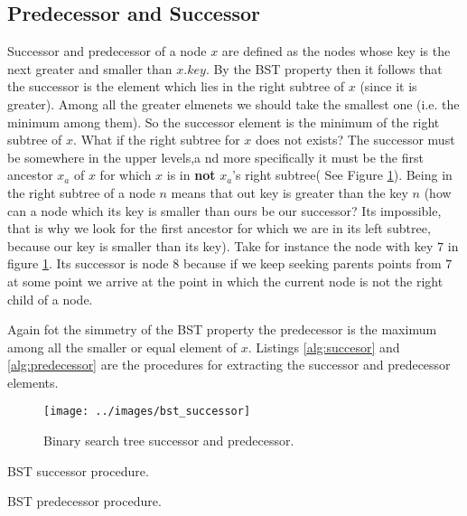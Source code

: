 \subsection{Predecessor and Successor}
Successor and predecessor of a node $x$ are defined as the nodes whose key is the next greater and smaller than $x.key$.
By the BST property then it follows that the successor is the element which lies in the right subtree of $x$ (since it is greater). Among all the greater elmenets we should take the smallest one (i.e. the minimum among them). So the successor element is the minimum of the right subtree of $x$. What if the right subtree for $x$ does not exists? The successor must be somewhere in the upper levels,a nd more specifically it must be the first ancestor $x_a$ of $x$ for which $x$ is in \textbf{not} $x_a$'s right subtree( See Figure \ref{fig:bst_successor}). Being in the right subtree of a node $n$ means that out key is greater than the key $n$ (how can a node which its key is smaller than ours be our successor? Its impossible, that is why we look for the first ancestor for which we are in its left subtree, because our key is smaller than its key).
Take for instance the node with key $7$ in figure \ref{fig:bst_successor}. Its successor is node $8$ because if we keep seeking parents points from $7$ at some point we arrive at the point in which the current node is not the right child of a node.

Again fot the simmetry of the BST property the predecessor is the maximum among all the smaller or equal element of $x$. 
Listings \ref{alg:succesor} and \ref{alg:predecessor} are the procedures for extracting the successor and predecessor elements.

	\begin{figure}
	\label{fig:bst_successor}
	\centering
		\texttt{[image: ../images/bst\_successor]}
		\caption{Binary search tree successor and predecessor.}
	\end{figure}
\begin{algorithm}
\caption{BST successor procedure.}\label{alg:successor}
\end{algorithm}

\begin{algorithm}
\caption{BST predecessor procedure.}\label{alg:successor}
\end{algorithm}

